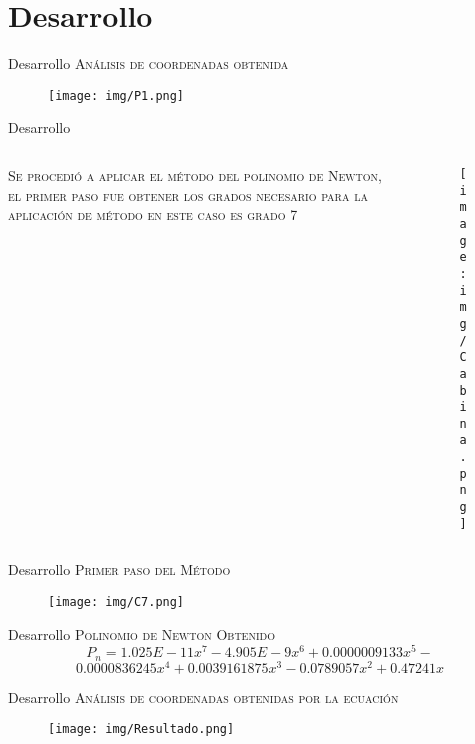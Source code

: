 \documentclass{cubeamer}
\begin{document}
\section{Desarrollo}

\begin{frame}{Desarrollo}
    \textsc{Análisis  de coordenadas obtenida}
            \begin{figure}
                \centering
                \texttt{[image: img/P1.png]}
            \end{figure}
\end{frame}

\begin{frame}{Desarrollo}
\begin{columns}
    \begin{column}{0.7\textwidth}
    \textsc{Se procedió a aplicar el método del polinomio de Newton, el primer paso fue obtener los grados necesario para la aplicación de método en este caso es grado 7}
    \end{column}
     \begin{column}{0.4\textwidth}
     \begin{figure}
                \centering
                \texttt{[image: img/Cabina.png]}
            \end{figure}
     \end{column}
\end{columns}
\end{frame}

\begin{frame}{Desarrollo}
    \textsc{Primer paso del Método}
            \begin{figure}
                \centering
                \texttt{[image: img/C7.png]}
            \end{figure}
\end{frame}

\begin{frame}{Desarrollo}
    \textsc{Polinomio de Newton Obtenido}
    \[ P_n=1.025E-11x^7-4.905E-9x^6+0.0000009133x^5-\]
\[ 0.0000836245x^4+0.0039161875x^3-0.0789057x^2+0.47241x\]
\end{frame}

\begin{frame}{Desarrollo}
    \textsc{Análisis de coordenadas obtenidas por la ecuación}
            \begin{figure}
                \centering
                \texttt{[image: img/Resultado.png]}
            \end{figure}
\end{frame}
\end{document}
